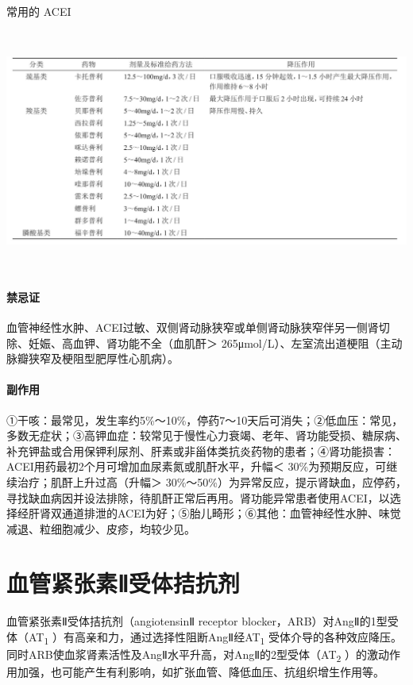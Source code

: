 \begin{table}[htbp]
\centering
\caption{常用的 ACEI}
\label{tab150-5}
\includegraphics[width=6.70833in,height=3.14583in]{./images/Image00561.jpg}
\end{table}

\paragraph{禁忌证}

血管神经性水肿、ACEI过敏、双侧肾动脉狭窄或单侧肾动脉狭窄伴另一侧肾切除、妊娠、高血钾、肾功能不全（血肌酐＞
265μmol/L）、左室流出道梗阻（主动脉瓣狭窄及梗阻型肥厚性心肌病）。

\paragraph{副作用}

①干咳：最常见，发生率约5\%～10\%，停药7～10天后可消失；②低血压：常见，多数无症状；③高钾血症：较常见于慢性心力衰竭、老年、肾功能受损、糖尿病、补充钾盐或合用保钾利尿剂、肝素或非甾体类抗炎药物的患者；④肾功能损害：ACEI用药最初2个月可增加血尿素氮或肌酐水平，升幅＜
30\%为预期反应，可继续治疗；肌酐上升过高（升幅＞
30\%～50\%）为异常反应，提示肾缺血，应停药，寻找缺血病因并设法排除，待肌酐正常后再用。肾功能异常患者使用ACEI，以选择经肝肾双通道排泄的ACEI为好；⑤胎儿畸形；⑥其他：血管神经性水肿、味觉减退、粒细胞减少、皮疹，均较少见。

\protect\hypertarget{text00412.html}{}{}

\section{血管紧张素Ⅱ受体拮抗剂}

血管紧张素Ⅱ受体拮抗剂（angiotensinⅡ receptor
blocker，ARB）对AngⅡ的1型受体（AT\textsubscript{1}
）有高亲和力，通过选择性阻断AngⅡ经AT\textsubscript{1}
受体介导的各种效应降压。同时ARB使血浆肾素活性及AngⅡ水平升高，对AngⅡ的2型受体（AT\textsubscript{2}
）的激动作用加强，也可能产生有利影响，如扩张血管、降低血压、抗组织增生作用等。

